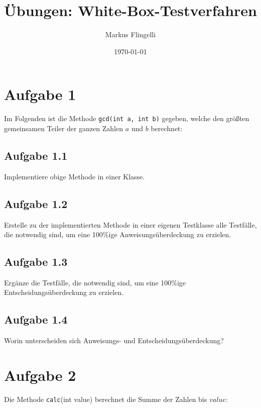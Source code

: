 

\title{Übungen: White-Box-Testverfahren}
\author{Markus Flingelli}
\date{\today}


\maketitle

\section*{Aufgabe 1}
Im Folgenden ist die Methode \lstinline{gcd(int a, int b)} gegeben, welche den größten gemeinsamen Teiler der ganzen Zahlen $a$ und $b$ berechnet:



\subsection*{Aufgabe 1.1}

Implementiere obige Methode in einer Klasse.

\subsection*{Aufgabe 1.2}

Erstelle zu der implementierten Methode in einer eigenen Testklasse alle Testfälle, die notwendig sind, um eine 100\%ige Anweisungsüberdeckung zu erzielen.

\subsection*{Aufgabe 1.3}

Ergänze die Testfälle, die notwendig sind, um eine 100\%ige Entscheidungsüberdeckung zu erzielen.

\subsection*{Aufgabe 1.4}

Worin unterscheiden sich Anweisungs- und Entscheidungsüberdeckung? 

\newpage
\section*{Aufgabe 2}
Die Methode \lstinline{calc}(int value) berechnet die Summe der Zahlen bis $value$:



